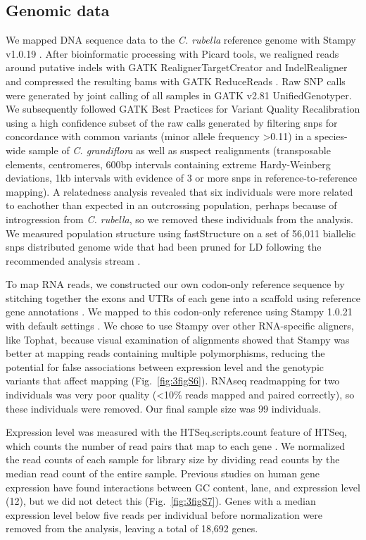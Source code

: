 \subsection{Genomic data}
We mapped DNA sequence data to the \textit{C. rubella} reference genome \citep{Slotte2013-py} with Stampy v1.0.19 \citep{Lunter2011-uc}. After bioinformatic processing with Picard tools, we realigned reads around putative indels with GATK RealignerTargetCreator and IndelRealigner and compressed the resulting bams with GATK ReduceReads \citep{DePristo2011-jc}. Raw SNP calls were generated by joint calling of all samples in GATK v2.81 UnifiedGenotyper. We subsequently followed GATK Best Practices for Variant Quality Recalibration using a high confidence subset of the  raw calls generated by filtering snps for concordance with common variants (minor allele frequency \textgreater 0.11) in a species-wide sample of \textit{C. grandiflora} \citep{Williamson2014-tf} as well as suspect realignments (transposable elements, centromeres, 600bp intervals containing extreme Hardy-Weinberg deviations, 1kb intervals with evidence of 3 or more snps in reference-to-reference mapping). A relatedness analysis revealed that six individuals were more related to eachother than expected in an outcrossing population, perhaps because of introgression from \textit{C. rubella}, so we removed these individuals from the analysis. We measured population structure using fastStructure on a set of 56,011 biallelic snps distributed genome wide that had been pruned for LD following the recommended analysis stream \citep{Raj2014-im}.

To map RNA reads, we constructed our own codon-only reference sequence by stitching together the exons and UTRs of each gene into a scaffold using reference gene annotations \citep{Slotte2013-py}. We mapped to this codon-only reference using Stampy 1.0.21 with default settings \citep{Lunter2011-uc}. We chose to use Stampy over other RNA-specific aligners, like Tophat, because visual examination of alignments showed that Stampy was better at mapping reads containing multiple polymorphisms, reducing the potential for false associations between expression level and the genotypic variants that affect mapping (Fig.~\ref{fig:3figS6}). RNAseq readmapping for two individuals was very poor quality (\textless10\% reads mapped and paired correctly), so these individuals were removed. Our final sample size was 99 individuals.

Expression level was measured with the HTSeq.scripts.count feature of HTSeq, which counts the number of read pairs that map to each gene \citep{Anders2015-qa}. We normalized the read counts of each sample for library size by dividing read counts by the median read count of the entire sample. Previous studies on human gene expression have found interactions between GC content, lane, and expression level (12), but we did not detect this (Fig.~\ref{fig:3figS7}). Genes with a median expression level below five reads per individual before normalization were removed from the analysis, leaving a total of 18,692 genes.

